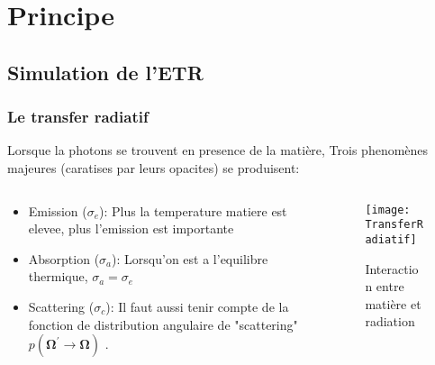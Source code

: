 
% 


\section{Principe}

\subsection{Simulation de l'ETR}

\begin{frame}
  \frametitle{Le transfer radiatif}

Lorsque la photons se trouvent en presence de la matière, Trois phenomènes majeures (caratises par leurs opacites) se produisent:

\begin{columns}
  \begin{column}{0.5\textwidth}
    \footnotesize
   \begin{itemize}
     \item Emission ($\sigma_e$): Plus la temperature matiere est elevee, plus l'emission est importante %
     \item Absorption ($\sigma_a$): Lorsqu'on est a l'equilibre thermique, $\sigma_a = \sigma_e$ %
     \item Scattering ($\sigma_c$): Il faut aussi tenir compte de la fonction de distribution angulaire de "scattering" $p(\bm{\Omega^\prime \rightarrow \bm{\Omega}})$ \parencite{Reference3}.
   \end{itemize}
  \end{column}
  \begin{column}{0.5\textwidth}
     \begin{figure}       
      \texttt{[image: TransferRadiatif]}       
      \caption{Interaction entre matière et radiation}
    \end{figure}
  \end{column}
 \end{columns}
 
\end{frame}

